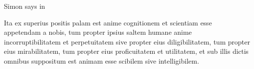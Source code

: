 \documentclass{article}
\begin{document}
Simon says in 

\beginnumbering
\pstart
Ita ex superius positis palam est anime cognitionem et
scientiam esse appetendam a nobis, tum propter ipsius saltem
humane anime incorruptibilitatem et perpetuitatem sive
propter eius diligibilitatem, tum propter eius mirabilitatem, tum propter eius
proficuitatem et utilitatem, et sub illis dictis omnibus suppositum est animam
esse scibilem sive intelligibilem. 
\pend
\endnumbering 
\end{document}
